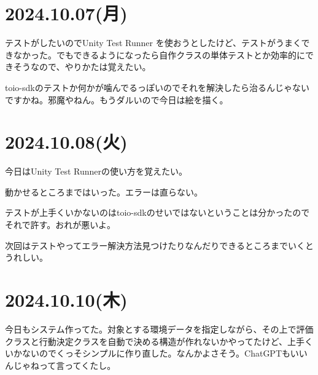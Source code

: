 \documentclass[twocolumn]{mynote}
\begin{document}
\section*{2024.10.07(月)}
テストがしたいのでUnity Test Runner を使おうとしたけど、テストがうまくできなかった。でもできるようになったら自作クラスの単体テストとか効率的にできそうなので、やりかたは覚えたい。

toio-sdkのテストか何かが噛んでるっぽいのでそれを解決したら治るんじゃないですかね。邪魔やねん。もうダルいので今日は絵を描く。

\section*{2024.10.08(火)}
今日はUnity Test Runnerの使い方を覚えたい。

動かせるところまではいった。エラーは直らない。

テストが上手くいかないのはtoio-sdkのせいではないということは分かったのでそれで許す。おれが悪いよ。

次回はテストやってエラー解決方法見つけたりなんだりできるところまでいくとうれしい。

\section*{2024.10.10(木)}
今日もシステム作ってた。対象とする環境データを指定しながら、その上で評価クラスと行動決定クラスを自動で決める構造が作れないかやってたけど、上手くいかないのでくっそシンプルに作り直した。なんかよさそう。ChatGPTもいいんじゃねって言ってくたし。

\fboxsep=0pt            %
\fboxrule=1pt            %
\begin{figure}[h]
  \centering
  \caption{}
  \label{fig:}
\end{figure}
\end{document}
